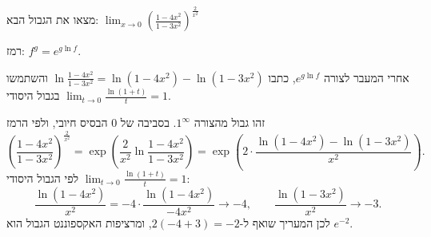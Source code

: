 
\begin{question}
מצאו את הגבול הבא:
$\displaystyle\lim_{x\to0}\left(\frac{1-4x^2}{1-3x^2}\right)^{\frac{2}{x^2}}$

רמז: $f^g=e^{g\ln f}$.
\end{question}

\begin{hint}
אחרי המעבר לצורה $e^{g\ln f}$, כתבו $\ln\frac{1-4x^2}{1-3x^2}=\ln(1-4x^2)-\ln(1-3x^2)$ והשתמשו בגבול היסודי $\lim_{t\to0}\frac{\ln(1+t)}{t}=1$.
\end{hint}

\begin{solution}
זהו גבול מהצורה $1^\infty$. בסביבה של $0$ הבסיס חיובי, ולפי הרמז
\[ \left(\frac{1-4x^2}{1-3x^2}\right)^{\frac2{x^2}}=\exp\!\left(\frac{2}{x^2}\ln\frac{1-4x^2}{1-3x^2}\right)=\exp\!\left(2\cdot\frac{\ln(1-4x^2)-\ln(1-3x^2)}{x^2}\right). \]
לפי הגבול היסודי $\lim_{t\to0}\frac{\ln(1+t)}{t}=1$:
\[ \frac{\ln(1-4x^2)}{x^2}=-4\cdot\frac{\ln(1-4x^2)}{-4x^2}\to-4,\qquad \frac{\ln(1-3x^2)}{x^2}\to-3. \]
לכן המעריך שואף ל-$2(-4+3)=-2$, ומרציפות האקספוננט הגבול הוא $e^{-2}$.
\end{solution}
